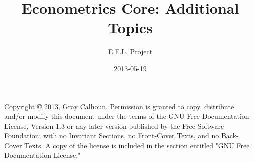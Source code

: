 \documentclass[nofonts]{tufte-latex/tufte-book}
\title{Econometrics Core: Additional Topics}
\author{E.F.L. Project}
\date{2013-05-19}
\begin{document}
\maketitle

Copyright © 2013, Gray Calhoun.  Permission is granted to copy,
distribute and/or modify this document under the terms of the GNU Free
Documentation License, Version 1.3 or any later version published by
the Free Software Foundation; with no Invariant Sections, no
Front-Cover Texts, and no Back-Cover Texts.  A copy of the license is
included in the section entitled "GNU Free Documentation License."

\tableofcontents





\appendix

\end{document}
